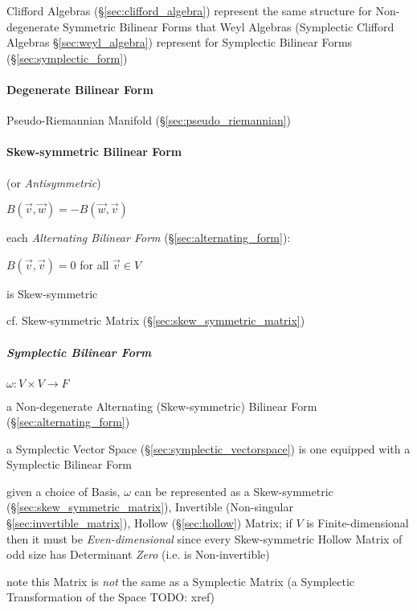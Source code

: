 Clifford Algebras (\S\ref{sec:clifford_algebra}) represent the same structure
for Non-degenerate Symmetric Bilinear Forms that Weyl Algebras (Symplectic
Clifford Algebras \S\ref{sec:weyl_algebra}) represent for Symplectic Bilinear
Forms (\S\ref{sec:symplectic_form})



\paragraph{Degenerate Bilinear Form}
\label{sec:degenerate_bilinear_form}\hfill

Pseudo-Riemannian Manifold (\S\ref{sec:pseudo_riemannian})



\paragraph{Skew-symmetric Bilinear Form}
\label{sec:skew_symmetric_bilinear}\hfill

(or \emph{Antisymmetric})

$B(\vec{v},\vec{w}) = -B(\vec{w},\vec{v})$

each \emph{Alternating Bilinear Form} (\S\ref{sec:alternating_form}):

$B(\vec{v},\vec{v}) = 0$ for all $\vec{v} \in V$

is Skew-symmetric

\fist cf. Skew-symmetric Matrix (\S\ref{sec:skew_symmetric_matrix})



\subparagraph{Symplectic Bilinear Form}\label{sec:symmetric_bilinear}\hfill

$\omega : V \times V \rightarrow F$

a Non-degenerate Alternating (Skew-symmetric) Bilinear Form
(\S\ref{sec:alternating_form})

a Symplectic Vector Space (\S\ref{sec:symplectic_vectorspace}) is one equipped
with a Symplectic Bilinear Form

given a choice of Basis, $\omega$ can be represented as a Skew-symmetric
(\S\ref{sec:skew_symmetric_matrix}), Invertible (Non-singular
\S\ref{sec:invertible_matrix}), Hollow (\S\ref{sec:hollow}) Matrix; if $V$ is
Finite-dimensional then it must be \emph{Even-dimensional} since every
Skew-symmetric Hollow Matrix of odd size has Determinant \emph{Zero} (i.e.
is Non-invertible)

note this Matrix is \emph{not} the same as a Symplectic Matrix (a Symplectic
Transformation of the Space TODO: xref)



